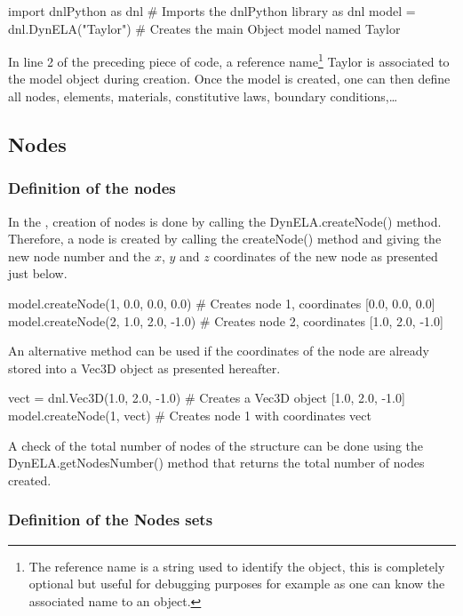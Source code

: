 \begin{PythonListing}
import dnlPython as dnl       # Imports the dnlPython library as dnl
model = dnl.DynELA("Taylor")  # Creates the main Object model named Taylor
\end{PythonListing}

In line 2 of the preceding piece of code, a reference name\footnote{The reference name is a string used to identify the object, this is completely optional but useful for debugging purposes for example as one can know the associated name to an object.} \textsf{Taylor} is associated to the model object during creation. Once the model is created, one can then define all nodes, elements, materials, constitutive laws, boundary conditions,\ldots

\subsection{Nodes}

\subsubsection{Definition of the nodes}

In the \DynELA, creation of nodes is done by calling the \textsf{DynELA.createNode()} method. Therefore, a node is created by calling the \textsf{createNode()} method and giving the new node number and the $x$, $y$ and $z$ coordinates of the new node as presented just below.

\begin{PythonListing}
model.createNode(1, 0.0, 0.0, 0.0)  # Creates node 1, coordinates [0.0, 0.0, 0.0]
model.createNode(2, 1.0, 2.0, -1.0) # Creates node 2, coordinates [1.0, 2.0, -1.0]
\end{PythonListing}

An alternative method can be used if the coordinates of the node are already stored into a Vec3D object as presented hereafter.

\begin{PythonListing}
vect = dnl.Vec3D(1.0, 2.0, -1.0) # Creates a Vec3D object [1.0, 2.0, -1.0]
model.createNode(1, vect)        # Creates node 1 with coordinates vect
\end{PythonListing}

A check of the total number of nodes of the structure can be done using the \textsf{DynELA.getNodesNumber()} method that returns the total number of nodes created.

\subsubsection{Definition of the Nodes sets}

